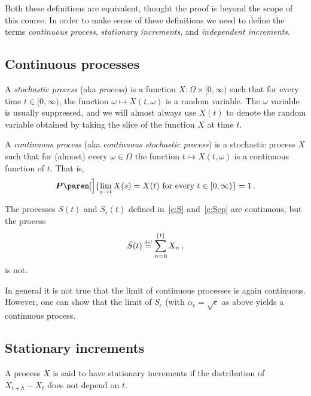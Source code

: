 Both these definitions are equivalent, thought the proof is beyond the scope of this course.
In order to make sense of these definitions we need to define the terms \emph{continuous process}, \emph{stationary increments}, and \emph{independent increments}.

\subsection{Continuous processes}
\begin{definition}
  A \emph{stochastic process} (aka \emph{process}) is a function $X\colon \Omega \times [0, \infty)$ such that for every time $t \in [0, \infty)$, the function $\omega \mapsto X(t, \omega)$ is a random variable.
  The $\omega$ variable is usually suppressed, and we will almost always use $X(t)$ to denote the random variable obtained by taking the slice of the function $X$ at time $t$.
\end{definition}

\begin{definition}
  A \emph{continuous process} (aka \emph{continuous stochastic process}) is a stochastic process $X$ such that for (almost) every $\omega \in \Omega$ the function $t \mapsto X(t, \omega)$ is a continuous function of $t$.
  That is, 
  \begin{equation*}
    \P\paren[\Big]{ \lim_{s \to t} X(s) = X(t) \text{ for every } t \in [0, \infty) }
    = 1\,.
  \end{equation*}
\end{definition}


The processes $S(t)$ and $S_\epsilon(t)$ defined in~\eqref{e:S} and~\eqref{e:Sep} are continuous, but the process
\begin{equation*}
  \tilde S(t) \stackrel{\scriptscriptstyle\textup{def}}{=} \sum_{n=0}^{\lfloor t\rfloor} X_n \,,
\end{equation*}
is not.

In general it is not true that the limit of continuous processes is again continuous.
However, one can show that the limit of $S_\epsilon$ (with $\alpha_\epsilon = \sqrt{\epsilon}$ as above yields a continuous process.

\subsection{Stationary increments}

\begin{definition}
  A process $X$ is said to have stationary increments if the distribution of $X_{t+h} - X_t$ does not depend on $t$.
\end{definition}

